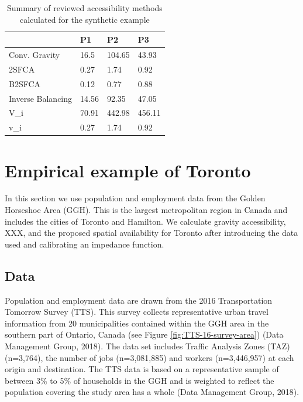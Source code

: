 \documentclass[]{elsarticle} %
\begin{document}
\begin{table}

\caption{\label{tab:all-access-measures-examples-table}\label{tab:all-access-measures-examples-table}Summary of reviewed accessibility methods calculated for the synthetic example}
\centering
\begin{tabular}[t]{llll}
\toprule
  & P1 & P2 & P3\\
\midrule
Conv. Gravity & 16.5 & 104.65 & 43.93\\
2SFCA & 0.27 & 1.74 & 0.92\\
B2SFCA & 0.12 & 0.77 & 0.88\\
Inverse Balancing & 14.56 & 92.35 & 47.05\\
V\_i & 70.91 & 442.98 & 456.11\\
\addlinespace
v\_i & 0.27 & 1.74 & 0.92\\
\bottomrule
\end{tabular}
\end{table}

\hypertarget{empirical-example-of-toronto}{%
\section{Empirical example of
Toronto}\label{empirical-example-of-toronto}}

In this section we use population and employment data from the Golden
Horseshoe Area (GGH). This is the largest metropolitan region in Canada
and includes the cities of Toronto and Hamilton. We calculate gravity
accessibility, XXX, and the proposed spatial availability for Toronto
after introducing the data used and calibrating an impedance function.

\hypertarget{data}{%
\subsection{Data}\label{data}}

Population and employment data are drawn from the 2016 Transportation
Tomorrow Survey (TTS). This survey collects representative urban travel
information from 20 municipalities contained within the GGH area in the
southern part of Ontario, Canada (see Figure
\ref{fig:TTS-16-survey-area}) (Data Management Group, 2018). The data
set includes Traffic Analysis Zones (TAZ) (n=3,764), the number of jobs
(n=3,081,885) and workers (n=3,446,957) at each origin and destination.
The TTS data is based on a representative sample of between 3\% to 5\%
of households in the GGH and is weighted to reflect the population
covering the study area has a whole (Data Management Group, 2018).
\end{document}
